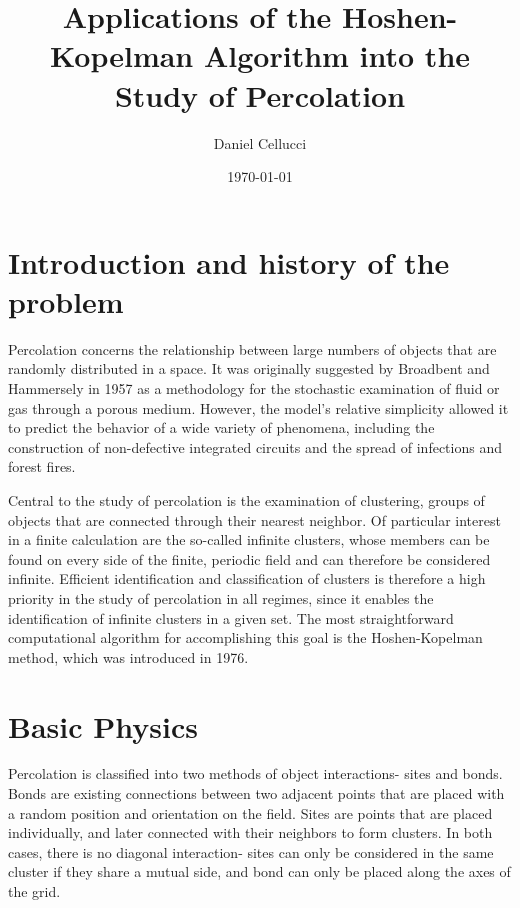 \documentclass[twocolumn,prb,amsmath,amssymb,amsfonts]{revtex4}
\begin{document}
\title{Applications of the Hoshen-Kopelman Algorithm into the Study of Percolation }

\author{Daniel Cellucci}

\date{\today}

\begin{abstract}

\end{abstract}

\maketitle
\section{Introduction and history of the problem}
Percolation concerns the relationship between large numbers of objects that are randomly distributed in a space. It was originally suggested by Broadbent and Hammersely in 1957 as a methodology for the stochastic examination of fluid or gas through a porous medium. However, the model's relative simplicity allowed it to predict the behavior of a wide variety of phenomena, including the construction of non-defective integrated circuits and the spread of infections and forest fires.  

Central to the study of percolation is the examination of clustering, groups of objects that are connected through their nearest neighbor. Of particular interest in a finite calculation are the so-called infinite clusters, whose members can be found on every side of the finite, periodic field and can therefore be considered infinite. Efficient identification and classification of clusters is therefore a high priority in the study of percolation in all regimes, since it enables the identification of infinite clusters in a given set. The most straightforward computational algorithm for accomplishing this goal is the Hoshen-Kopelman method, which was introduced in 1976.

\section{Basic Physics}
Percolation is classified into two methods of object interactions- sites and bonds. Bonds are existing connections between two adjacent points that are placed with a random position and orientation on the field. Sites are points that are placed individually, and later connected with their neighbors to form clusters. In both cases, there is no diagonal interaction- sites can only be considered in the same cluster if they share a mutual side, and bond can only be placed along the axes of the grid.
\end{document}
